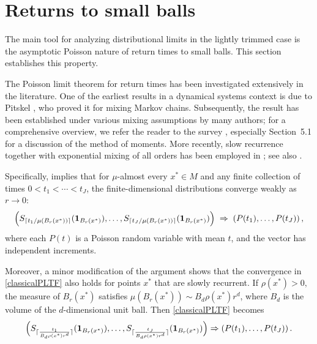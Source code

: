\documentclass[11pt,twoside,a4paper,reqno]{amsart}
\def\one{{\mathbf{1}}}
\begin{document}
\section{Returns to small balls}\label{PoiLgT}

The main tool for analyzing distributional limits in the lightly trimmed case is the asymptotic Poisson nature of return times to small balls. This section establishes this property.

The Poisson limit theorem for return times has been investigated extensively in the literature. One of the earliest results in a dynamical systems context is due to Pitskel \cite{PitPois}, who proved it for mixing Markov chains. Subsequently, the result has been established under various mixing assumptions by many authors; for a comprehensive overview, we refer the reader to the survey \cite{Haydn13}, especially Section~5.1 for a discussion of the method of moments. More recently, slow recurrence together with exponential mixing of all orders has been employed in \cite{DFL22}; see also \cite{auerp}.



Specifically, \cite[Proposition~20]{auerp} implies that for $\mu$-almost every $x^* \in M$ and any finite collection of times $0<t_1<\cdots<t_J$, the finite-dimensional distributions converge weakly as $r \to 0$:
\begin{equation}\label{classicalPLTF}
\Bigl(S_{\lceil t_1 / \mu(B_r(x^*)) \rceil} (\one_{B_r(x^*)}), \ldots, S_{\lceil t_J / \mu(B_r(x^*)) \rceil} (\one_{B_r(x^*)})\Bigr) \;\Rightarrow\; \left(P(t_1), \ldots, P(t_J)\right),
\end{equation}
where each $P(t)$ is a Poisson random variable with mean $t$, and the vector has independent increments.






Moreover, a minor modification of the argument shows that the convergence in \eqref{classicalPLTF} also holds for points $x^*$ that are slowly recurrent.
If $\rho(x^*)>0,$ the measure of $B_r(x^*)$ satisfies $\mu(B_r(x^*))\sim B_d \rho(x^*) r^d$, where $B_d$ is the volume of the $d$-dimensional unit ball. Then \eqref{classicalPLTF} becomes
\begin{equation*}
\Bigl(S_{\lceil \frac{t_1}{B_d \rho(x^*)r^d}\rceil} (\one_{B_r(x^*)}),\ldots, S_{\lceil\frac{t_J}{B_d \rho(x^*)r^d} \rceil} (\one_{B_r(x^*)})\Bigr) \Rightarrow \left(P(t_1),\ldots, P(t_J)\right).
\end{equation*}
\end{document}
